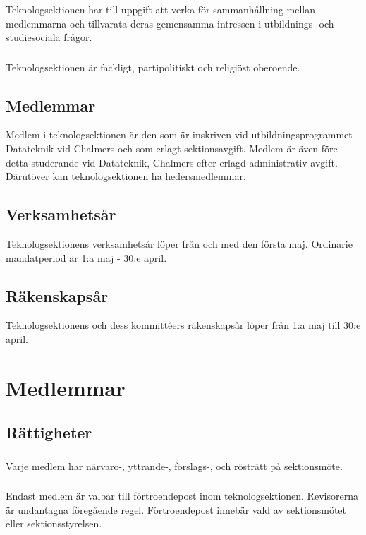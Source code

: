 \documentclass[a4paper]{dtek}
\begin{document}
\subsubsection{}
Teknologsektionen har till uppgift att verka för sammanhållning mellan medlemmarna och tillvarata deras gemensamma intressen i utbildnings- och studiesociala frågor.
\subsubsection{}
Teknologsektionen är fackligt, partipolitiskt och religiöst oberoende.
\subsection{Medlemmar}
Medlem i teknologsektionen är den som är inskriven vid utbildningsprogrammet Datateknik vid Chalmers och som erlagt sektionsavgift. Medlem är även före detta studerande vid Datateknik, Chalmers efter erlagd administrativ avgift. Därutöver kan teknologsektionen ha hedersmedlemmar.
\subsection{Verksamhetsår}
Teknologsektionens verksamhetsår löper från och med den första maj. Ordinarie mandatperiod är 1:a maj - 30:e april.
\subsection{Räkenskapsår}
Teknologsektionens och dess kommittéers räkenskapsår löper från 1:a maj till 30:e april.
\newpage

\section{Medlemmar}
\subsection{Rättigheter}
\subsubsection{}
Varje medlem har närvaro-, yttrande-, förslags-, och rösträtt på sektionsmöte.
\subsubsection{}
Endast medlem är valbar till förtroendepost inom teknologsektionen. Revisorerna är undantagna föregående regel. Förtroendepost innebär vald av sektionsmötet eller sektionsstyrelsen.
\end{document}
